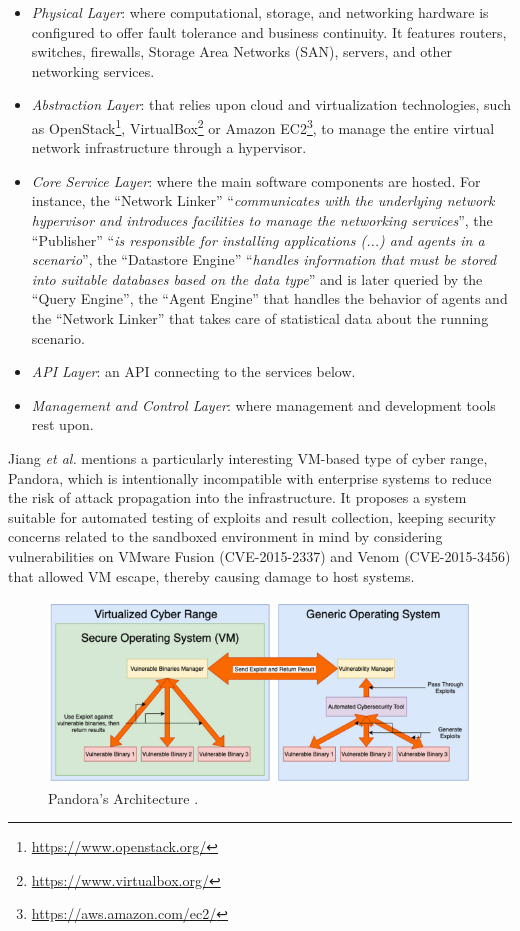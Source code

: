\begin{itemize}
    \item \textit{Physical Layer}: where computational, storage, and networking hardware is configured to offer fault tolerance and business continuity. It features routers, switches, firewalls, Storage Area Networks (SAN), servers, and other networking services.
    \item \textit{Abstraction Layer}: that relies upon cloud and virtualization technologies, such as OpenStack\footnote{\url{https://www.openstack.org/}}, VirtualBox\footnote{\url{https://www.virtualbox.org/}} or Amazon EC2\footnote{\url{https://aws.amazon.com/ec2/}}, to manage the entire virtual network infrastructure through a hypervisor. 
    \item \textit{Core Service Layer}: where the main software components are hosted. For instance, the ``Network Linker'' ``\textit{communicates with the underlying network hypervisor and introduces facilities to manage the networking services}'', the ``Publisher'' ``\textit{is responsible for installing applications (...) and agents in a scenario}'', the ``Datastore Engine'' ``\textit{handles information that must be stored into suitable databases based on the data type}'' and is later queried by the ``Query Engine'', the ``Agent Engine'' that handles the behavior of agents and the ``Network Linker'' that takes care of statistical data about the running scenario.
    \item \textit{API Layer}: an API connecting to the services below. 
    \item \textit{Management and Control Layer}: where management and development tools rest upon.
\end{itemize}


Jiang \textit{et al.} \cite{pandora_ref} mentions a particularly interesting VM-based type of cyber range, Pandora, which is intentionally incompatible with enterprise systems to reduce the risk of attack propagation into the infrastructure. It proposes a system suitable for automated testing of exploits and result collection, keeping security concerns related to the sandboxed environment in mind by considering vulnerabilities on VMware Fusion (CVE-2015-2337) and Venom (CVE-2015-3456) that allowed VM escape, thereby causing damage to host systems. 

\begin{figure}[H]
    \includegraphics[width=14cm]{figures/pandora_architecture.png}
    \caption{Pandora's Architecture \cite{cytrone_ref}.}
    \label{fig:pandora_architecture}
\end{figure}


